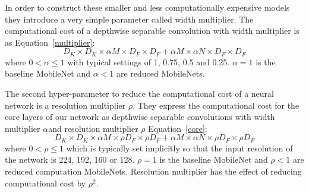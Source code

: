 \documentclass[twocolumn]{article}
\begin{document}
	In order to construct these smaller and less computationally expensive models they introduce a very simple parameter called width multiplier. The computational cost of a depthwise separable convolution with width multiplier is as Equation~\ref{multiplier}:
	\begin{equation}
	D_K \times D_K \times \alpha M \times D_F \times D_F + \alpha M \times \alpha N \times D_F \times D_F     \label{multiplier}
	\end{equation}
	where $0<\alpha\le 1  $ with typical settings of 1, 0.75, 0.5 and 0.25. $\alpha = 1$ is the baseline MobileNet and $\alpha < 1$ are reduced MobileNets.
	
	The second hyper-parameter to reduce the computational cost of a neural network is a resolution multiplier $\rho$. They express the computational cost for the core layers of our network as depthwise separable convolutions with width multiplier $\alpha$and resolution multiplier $\rho$ Equation~\ref{core}:
	\begin{equation}
	D_K \times D_K \times \alpha M \times \rho D_F \times \rho D_F + \alpha M \times \alpha N \times \rho D_F \times \rho D_F    \label{core}
	\end{equation}
	where $0<\rho\le 1$ which is typically set implicitly so that the input resolution of the network is 224, 192, 160 or 128. $\rho = 1$ is the baseline MobileNet and $\rho < 1$  are reduced computation MobileNets. Resolution multiplier has the effect of reducing computational cost by $\rho ^2$.
\end{document}
